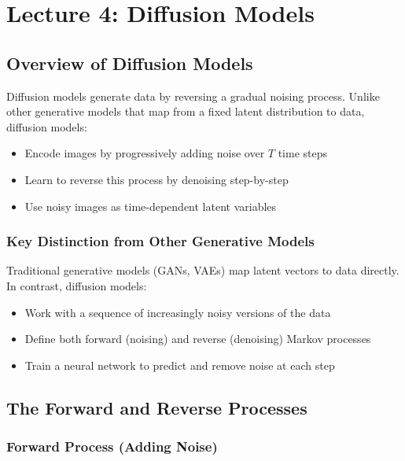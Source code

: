 \chapter{\normalsize Lecture 4: Diffusion Models}

\section{Overview of Diffusion Models}

Diffusion models generate data by reversing a gradual noising process. Unlike other generative models that map from a fixed latent distribution to data, diffusion models:

\begin{itemize}
    \item Encode images by progressively adding noise over $T$ time steps
    \item Learn to reverse this process by denoising step-by-step
    \item Use noisy images as time-dependent latent variables
\end{itemize}

\subsection*{Key Distinction from Other Generative Models}

Traditional generative models (GANs, VAEs) map latent vectors to data directly. In contrast, diffusion models:

\begin{itemize}
    \item Work with a sequence of increasingly noisy versions of the data
    \item Define both forward (noising) and reverse (denoising) Markov processes
    \item Train a neural network to predict and remove noise at each step
\end{itemize}

\section{The Forward and Reverse Processes}

\subsection*{Forward Process (Adding Noise)}

